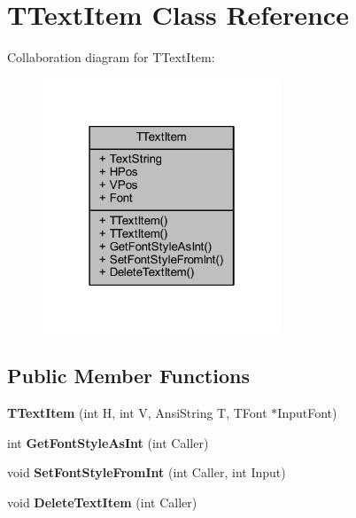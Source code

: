\hypertarget{class_t_text_item}{}\section{T\+Text\+Item Class Reference}
\label{class_t_text_item}


Collaboration diagram for T\+Text\+Item\+:\nopagebreak
\begin{figure}[H]
\begin{center}
\leavevmode
\includegraphics[width=202pt]{class_t_text_item__coll__graph}
\end{center}
\end{figure}
\subsection*{Public Member Functions}
\begin{DoxyCompactItemize}
\item 
\mbox{\label{class_t_text_item_abb28782b47199def531bc91c70ebe6c8}} 
{\bfseries T\+Text\+Item} (int H, int V, Ansi\+String T, T\+Font $\ast$Input\+Font)
\item 
\mbox{\label{class_t_text_item_a7715fccdffe55ff5d780c4b6e22d2e7f}} 
int {\bfseries Get\+Font\+Style\+As\+Int} (int Caller)
\item 
\mbox{\label{class_t_text_item_a61c23aca0093a41c1c366c0eac7f80ca}} 
void {\bfseries Set\+Font\+Style\+From\+Int} (int Caller, int Input)
\item 
\mbox{\label{class_t_text_item_afa20e50741bdae9bed5d81a4038d572a}} 
void {\bfseries Delete\+Text\+Item} (int Caller)
\end{DoxyCompactItemize}
